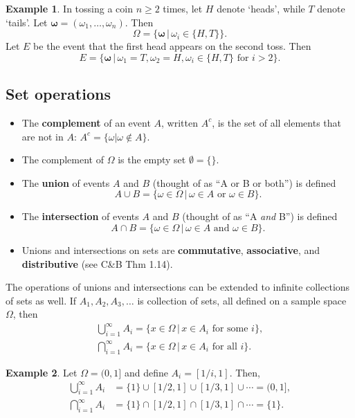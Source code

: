 \documentclass[
]{book}
\providecommand{\tightlist}{%
  \setlength{\itemsep}{0pt}\setlength{\parskip}{0pt}}
\newcommand{\bomega}{{\boldsymbol\omega}}
\theoremstyle{definition}
\theoremstyle{definition}
\newtheorem{example}{Example}[chapter]
\theoremstyle{definition}
\theoremstyle{definition}
\theoremstyle{remark}
\begin{document}
\begin{example}
In tossing a coin \(n \geq 2\) times, let \(H\) denote `heads', while \(T\) denote `tails'.
Let \(\bomega = (\omega_1,\dots,\omega_n)\).
Then \[
\Omega = \Big\{ \bomega \, \big|\, \omega_i \in \{H,T\} \Big\}.
\]
Let \(E\) be the event that the first head appears on the second toss. Then
\[
E = \Big\{ \bomega \, \big|\, \omega_1 = T, \omega_2 = H, \omega_i \in \{H,T\} \text{ for } i > 2 \Big\}.
\]
\end{example}

\hypertarget{set-operations}{%
\subsection{Set operations}\label{set-operations}}

\begin{itemize}
\tightlist
\item
  The \textbf{complement} of an event \(A\), written \(A^c\), is the set of all elements that are not in \(A\): \(A^c = \{\omega | \omega\not\in A \}\).
\item
  The complement of \(\Omega\) is the empty set \(\emptyset = \{\}\).
\item
  The \textbf{union} of events \(A\) and \(B\) (thought of as ``A or B or both'') is defined
  \[
  A \cup B = \{\omega \in \Omega \,|\, \omega \in A \text{ or } \omega \in B \}.
  \]
\item
  The \textbf{intersection} of events \(A\) and \(B\) (thought of as ``A \emph{and} B'') is defined
  \[
  A \cap B = \{\omega \in \Omega \,|\, \omega \in A \text{ and } \omega \in B \}.
  \]
\item
  Unions and intersections on sets are \textbf{commutative}, \textbf{associative}, and \textbf{distributive} (see C\&B Thm 1.14).
\end{itemize}

The operations of unions and intersections can be extended to infinite collections of sets as well.
If \(A_1,A_2,A_3,\dots\) is collection of sets, all defined on a sample space \(\Omega\), then
\begin{gather*}
\bigcup_{i=1}^\infty A_i = \{x \in \Omega \,|\, x\in A_i \text{ for some } i \}, \\
\bigcap_{i=1}^\infty A_i = \{x \in \Omega \,|\, x\in A_i \text{ for all } i \}.
\end{gather*}

\begin{example}
Let \(\Omega=(0,1]\) and define \(A_i=[1/i, 1]\). Then,
\begin{align*}
\bigcup_{i=1}^\infty A_i
&= \{1\} \cup [1/2, 1] \cup [1/3, 1] \cup \cdots = (0,1], \\
\bigcap_{i=1}^\infty A_i
&= \{1\} \cap [1/2, 1] \cap [1/3, 1] \cap \cdots = \{1\}.
\end{align*}
\end{example}
\end{document}
